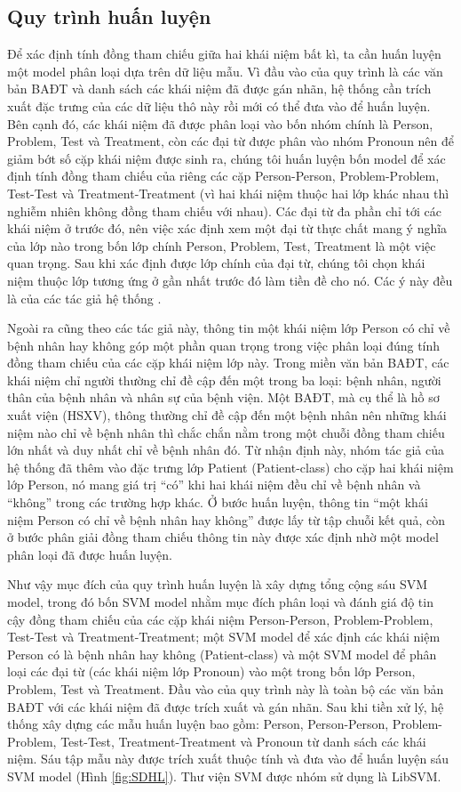 \subsection*{Quy trình huấn luyện}
Để xác định tính đồng tham chiếu giữa hai khái niệm bất kì, ta cần huấn luyện một model phân loại dựa trên dữ liệu mẫu. Vì đầu vào của quy trình là các văn bản BAĐT và danh sách các khái niệm đã được gán nhãn, hệ thống cần trích xuất đặc trưng của các dữ liệu thô này rồi mới có thể đưa vào để huấn luyện. Bên cạnh đó, các khái niệm đã được phân loại vào bốn nhóm chính là Person, Problem, Test và Treatment, còn các đại từ được phân vào nhóm Pronoun nên để giảm bớt số cặp khái niệm được sinh ra, chúng tôi huấn luyện bốn model để xác định tính đồng tham chiếu của riêng các cặp Person-Person, Problem-Problem, Test-Test và Treatment-Treatment (vì hai khái niệm thuộc hai lớp khác nhau thì nghiễm nhiên không đồng tham chiếu với nhau). Các đại từ đa phần chỉ tới các khái niệm ở trước đó, nên việc xác định xem một đại từ thực chất mang ý nghĩa của lớp nào trong bốn lớp chính Person, Problem, Test, Treatment là một việc quan trọng. Sau khi xác định được lớp chính của đại từ, chúng tôi chọn khái niệm thuộc lớp tương ứng ở gần nhất trước đó làm tiền đề cho nó. Các ý này đều là của các tác giả hệ thống \cite{YanXu2012}.

Ngoài ra cũng theo các tác giả này, thông tin một khái niệm lớp Person có chỉ về bệnh nhân hay không góp một phần quan trọng trong việc phân loại đúng tính đồng tham chiếu của các cặp khái niệm lớp này. Trong miền văn bản BAĐT, các khái niệm chỉ người thường chỉ đề cập đến một trong ba loại: bệnh nhân, người thân của bệnh nhân và nhân sự của bệnh viện. Một BAĐT, mà cụ thể là hồ sơ xuất viện (HSXV), thông thường chỉ đề cập đến một bệnh nhân nên những khái niệm nào chỉ về bệnh nhân thì chắc chắn nằm trong một chuỗi đồng tham chiếu lớn nhất và duy nhất chỉ về bệnh nhân đó. Từ nhận định này, nhóm tác giả của hệ thống \cite{YanXu2012} đã thêm vào đặc trưng lớp Patient (Patient-class) cho cặp hai khái niệm lớp Person, nó mang giá trị ``có'' khi hai khái niệm đều chỉ về bệnh nhân và ``không'' trong các trường hợp khác. Ở bước huấn luyện, thông tin ``một khái niệm Person có chỉ về bệnh nhân hay không'' được lấy từ tập chuỗi kết quả, còn ở bước phân giải đồng tham chiếu thông tin này được xác định nhờ một model phân loại đã được huấn luyện.

Như vậy mục đích của quy trình huấn luyện là xây dựng tổng cộng sáu SVM model, trong đó bốn SVM model nhằm mục đích phân loại và đánh giá độ tin cậy đồng tham chiếu của các cặp khái niệm Person-Person, Problem-Problem, Test-Test và Treatment-Treatment; một SVM model để xác định các khái niệm Person có là bệnh nhân hay không (Patient-class) và một SVM model để phân loại các đại từ (các khái niệm lớp Pronoun) vào một trong bốn lớp Person, Problem, Test và Treatment. Đầu vào của quy trình này là toàn bộ các văn bản BAĐT với các khái niệm đã được trích xuất và gán nhãn. Sau khi tiền xử lý, hệ thống xây dựng các mẫu huấn luyện bao gồm: Person, Person-Person, Problem-Problem, Test-Test, Treatment-Treatment và Pronoun từ danh sách các khái niệm. Sáu tập mẫu này được trích xuất thuộc tính và đưa vào để huấn luyện sáu SVM model (Hình \ref{fig:SDHL}). Thư viện SVM được nhóm sử dụng là LibSVM. 

